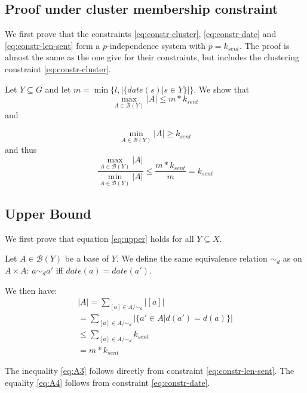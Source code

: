 \documentclass[a4paper,BCOR=10mm]{report}
\numberwithin{lemma}{chapter}
\numberwithin{definition}{chapter}
\begin{document}
\begin{appendices}
\section{Proof under cluster membership constraint} \label{sec:proof-cluster-constr}

We first prove that the constraints \ref{eq:constr-cluster}, \ref{eq:constr-date} and \ref{eq:constr-len-sent} form a $p$-independence system with $p = k_{sent}$.
The proof is almost the same as the one \citet{markert} give for their constraints, but includes the clustering constraint \ref{eq:constr-cluster}.

Let $Y \subseteq G$ and let $m = \min \{ l, |\{\mathit{date}(s) | s \in Y\}| \}$.
We show that 
\begin{equation}
\max_{A \in \mathcal{B}(Y)} |A| \leq m * k_{sent} \label{eq:upper}
\end{equation}
 and

\begin{equation}
\min_{A \in \mathcal{B}(Y)} |A| \geq k_{sent} \label{eq:lower}
\end{equation}
and thus 
\begin{equation}
\frac{\max_{A \in \mathcal{B}(Y)} |A|}{\min_{A \in \mathcal{B}(Y)} |A|}
\leq \frac{m * k_{sent}}{m} = k_{sent}    
\end{equation}

\subsection{Upper Bound} \label{sec:cluster-upper-bound}

We first prove that equation \ref{eq:upper} holds for all $Y \subseteq X$.

Let $A \in \mathcal{B}(Y)$ be a base of $Y$. We define the same equivalence relation $\sim_d$ as \citeauthor{markert} on $A \times A$:
$a \sim_d a'$ iff $\mathit{date}(a) = \mathit{date}(a')$.

We then have:
\begin{align}
|A| = \sum_{[a] \in A/\sim_d} |[a]| \\
    = \sum_{[a] \in A/\sim_d} |\{ a' \in A | d(a') = d(a) \}| \label{eq:A2} \\
    \leq \sum_{[a] \in A/\sim_d} k_{sent} \label{eq:A3} \\
    = m * k_{sent} \label{eq:A4}
\end{align}

The inequality \ref{eq:A3} follows directly from constraint \ref{eq:constr-len-sent}.
The equality \ref{eq:A4} follows from constraint \ref{eq:constr-date}.



\end{appendices}
\end{document}
